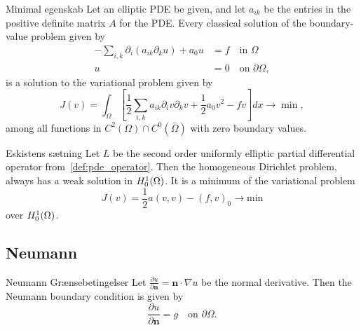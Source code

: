 \begin{frame}{Minimal egenskab}{}
    Let an elliptic PDE be given, and let $a_{ik}$ be the entries in the positive definite matrix $A$ for the PDE.
    Every classical solution of the boundary-value problem given by
    \begin{align}
        -\sum_{i,k} \partial_i (a_{ik}\partial_k u) + a_0 u &= f \quad \text{in } \Omega  \\
        u &= 0 \quad \text{on } \partial \Omega,
    \end{align}
        is a solution to the variational problem given by
        \[
            J(v)=\int_\Omega \left [\frac{1}{2}\sum_{i,k} a_{ik} \partial_i v\partial_k v + \frac{1}{2} a_0 v^2 -fv\right ]dx \longrightarrow \min,
        \]
        among all functions in $C^2(\Omega)\cap C^0(\bar{\Omega})$ with zero boundary values.
\end{frame}

\begin{frame}{Eskistens sætning}{}
    Let $L$ be the second order uniformly elliptic partial differential operator from~\eqref{def:pde_operator}.\label{thm:existence_hom_dirichlet}
    Then the homogeneous Dirichlet problem, always has a weak solution in $H_0^1(\Omega)$. It is a minimum of the variational problem
   \begin{equation}
       J(v)=\frac{1}{2} a(v,v) - {(f, v)}_0 \rightarrow \text{min}
   \end{equation}
   over $H_0^1(\Omega)$.
\end{frame}

\subsection{Neumann}
\begin{frame}{Neumann Grænsebetingelser}{}
    Let $\frac{\partial u}{\partial \mathbf{n}}= \mathbf{n}\cdot \nabla u$ be the normal derivative. Then the Neumann boundary condition is given by
    \begin{equation}
        \frac{\partial u}{\partial \mathbf{n}}  = g\quad \text{on } \partial \Omega.
    \end{equation}
\end{frame}

